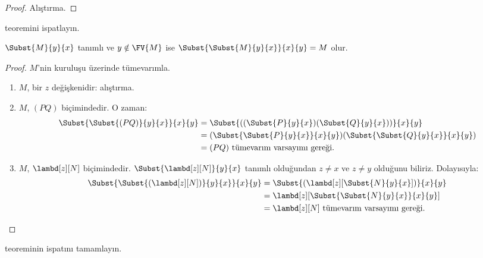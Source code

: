 \begin{proof}
  Alıştırma.
\end{proof}

\begin{prob}
   teoremini ispatlayın.
\end{prob}


\begin{thm}
  $\Subst{M}{y}{x}$ tanımlı ve $y \notin \FV{M}$ ise
  $\Subst{\Subst{M}{y}{x}}{x}{y} = M$ olur.
\end{thm}

\begin{proof}
  $M$'nin kuruluşu üzerinde tümevarımla.
  \begin{enumerate}
  \item $M$, bir $z$ değişkenidir: alıştırma.
  \item $M$, $(PQ)$ biçimindedir. O zaman:
    \begin{align*}
      \Subst{\Subst{(PQ)}{y}{x}}{x}{y}
      &=\Subst{((\Subst{P}{y}{x})(\Subst{Q}{y}{x}))}{x}{y} \\
      &= (\Subst{\Subst{P}{y}{x}}{x}{y})(\Subst{\Subst{Q}{y}{x}}{x}{y}) \\
      &= (PQ) \text{ tümevarım varsayımı gereği.}
    \end{align*}
  \item $M$, $\lambd[z][N]$ biçimindedir.
    $\Subst{\lambd[z][N]}{y}{x}$ tanımlı olduğundan $z\neq x$ ve
    $z\neq y$ olduğunu biliriz. Dolayısıyla:
    \begin{align*}
      \Subst{\Subst{(\lambd[z][N])}{y}{x}}{x}{y}
      & = \Subst{(\lambd[z][\Subst{N}{y}{x}])}{x}{y} \\
      & = \lambd[z][\Subst{\Subst{N}{y}{x}}{x}{y}] \\
      &= \lambd[z][N] \text{ tümevarım varsayımı gereği.}
    \end{align*}
  \end{enumerate}
\end{proof}

\begin{prob}
   teoreminin ispatını tamamlayın.
\end{prob}

